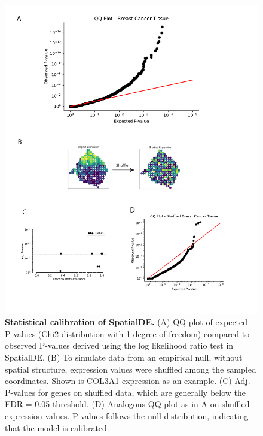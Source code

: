 \begin{figure}
    \centering
    \includegraphics[width=\textwidth]{"SuppFig4"}
    \caption[Statistical calibration of SpatialDE]{\textbf{Statistical calibration of SpatialDE.} (A) QQ-plot of expected P-values (Chi2 distribution with 1 degree of freedom) compared to observed P-values derived using the log likelihood ratio test in SpatialDE. (B) To simulate data from an empirical null, without spatial structure, expression values were shuffled among the sampled coordinates. Shown is  COL3A1 expression as an example. (C) Adj. P-values for genes on shuffled data, which are generally below the FDR = 0.05 threshold. (D) Analogous QQ-plot as in A on shuffled expression values. P-values follows the null distribution, indicating that the model is calibrated.}
    \label{fig:ss4}
\end{figure}

